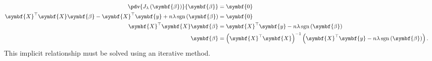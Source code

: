 \documentclass{article}
\DeclareMathOperator{\sgn}{sgn}
\begin{document}
\begin{align*}
    \pdv{J_{\lambda}\left( \symbf{\beta} \right)}{\symbf{\beta}}                                                     & = \symbf{0}                                                                                                                              \\
    \symbf{X}^\top \symbf{X} \symbf{\beta} - \symbf{X}^\top \symbf{y} + n \lambda \sgn{\left( \symbf{\beta} \right)} & = \symbf{0}                                                                                                                              \\
    \symbf{X}^\top \symbf{X} \symbf{\beta}                                                                           & = \symbf{X}^\top \symbf{y} - n \lambda \sgn{\left( \symbf{\beta} \right)}                                                                \\
    \symbf{\beta}                                                                                                    & = {\left( \symbf{X}^\top \symbf{X} \right)}^{-1} \left( \symbf{X}^\top \symbf{y} - n \lambda \sgn{\left( \symbf{\beta} \right)} \right).
\end{align*}
This implicit relationship must be solved using an iterative method.
\end{document}
